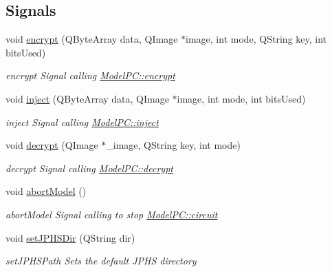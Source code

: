 \subsection*{Signals}
\begin{DoxyCompactItemize}
\item 
void \hyperlink{class_view_p_c_aaab3c809a069aed248ef7100daabf8ee}{encrypt} (Q\+Byte\+Array data, Q\+Image $\ast$image, int mode, Q\+String key, int bits\+Used)
\begin{DoxyCompactList}\small\item\em encrypt Signal calling \hyperlink{class_model_p_c_a6f191f62d4635d0d3555fcc0be298794}{Model\+P\+C\+::encrypt} \end{DoxyCompactList}\item 
void \hyperlink{class_view_p_c_a652c98014c2df32178d43a5a9612dd99}{inject} (Q\+Byte\+Array data, Q\+Image $\ast$image, int mode, int bits\+Used)
\begin{DoxyCompactList}\small\item\em inject Signal calling \hyperlink{class_model_p_c_aada6a04d81ada8f2b4ba18108c8d6f10}{Model\+P\+C\+::inject} \end{DoxyCompactList}\item 
void \hyperlink{class_view_p_c_a365df051360d557c7221474ad856e0af}{decrypt} (Q\+Image $\ast$\+\_\+image, Q\+String key, int mode)
\begin{DoxyCompactList}\small\item\em decrypt Signal calling \hyperlink{class_model_p_c_a5995215a34a1e1f504035715a8013809}{Model\+P\+C\+::decrypt} \end{DoxyCompactList}\item 
void \hyperlink{class_view_p_c_aa652102ce6b5757b8eef830409c8cabf}{abort\+Model} ()
\begin{DoxyCompactList}\small\item\em abort\+Model Signal calling to stop \hyperlink{class_model_p_c_a1d0091062a0c836b283ec2f67411623b}{Model\+P\+C\+::circuit} \end{DoxyCompactList}\item 
void \hyperlink{class_view_p_c_ae81085836c0c01bc9556a5b27eb8d19c}{set\+J\+P\+H\+S\+Dir} (Q\+String dir)
\begin{DoxyCompactList}\small\item\em set\+J\+P\+H\+S\+Path Sets the default J\+P\+HS directory \end{DoxyCompactList}\end{DoxyCompactItemize}
